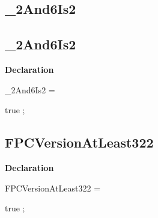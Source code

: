 \documentclass{report}
\newif\ifpdf
\begin{document}
\subsection*{\large{\textbf{{\_}2And6Is2}}\normalsize\hspace{1ex}\hrulefill}
\else
\subsection*{{\_}2And6Is2}
\fi
\label{ok_if_expressions_2-_2And6Is2}
\begin{list}{}{
\setlength{\itemindent}{0cm}
\setlength{\listparindent}{0cm}
\setlength{\leftmargin}{\evensidemargin}
\addtolength{\leftmargin}{\tmplength}
\settowidth{\labelsep}{X}
\addtolength{\leftmargin}{\labelsep}
\setlength{\labelwidth}{\tmplength}
}
\item[\textbf{Declaration}\hfill]
\ifpdf
\begin{flushleft}
\fi
\begin{ttfamily}
{\_}2And6Is2 =

true
;\end{ttfamily}

\ifpdf
\end{flushleft}
\fi

\end{list}
\ifpdf
\subsection*{\large{\textbf{FPCVersionAtLeast322}}\normalsize\hspace{1ex}\hrulefill}
\else
\subsection*{FPCVersionAtLeast322}
\fi
\label{ok_if_expressions_2-FPCVersionAtLeast322}
\begin{list}{}{
\setlength{\itemindent}{0cm}
\setlength{\listparindent}{0cm}
\setlength{\leftmargin}{\evensidemargin}
\addtolength{\leftmargin}{\tmplength}
\settowidth{\labelsep}{X}
\addtolength{\leftmargin}{\labelsep}
\setlength{\labelwidth}{\tmplength}
}
\item[\textbf{Declaration}\hfill]
\ifpdf
\begin{flushleft}
\fi
\begin{ttfamily}
FPCVersionAtLeast322 =

true
;\end{ttfamily}

\ifpdf
\end{flushleft}
\fi

\end{list}
\ifpdf
\end{document}
